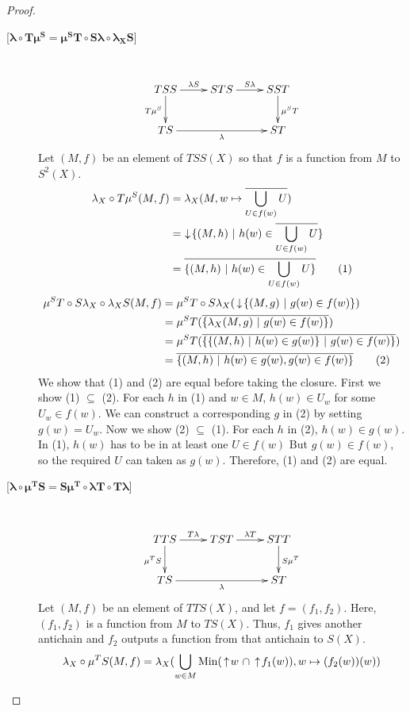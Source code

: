 \begin{proof}
\begin{description}
\item[{[}$\boldsymbol{\lambda\circ T\mu^S = \mu^S T\circ S\lambda\circ\lambda_X S}${]}] \hfill \\
\[
\xymatrix{
TSS\ar[r]^{\lambda S}\ar[d]_{T\mu^S} & STS\ar[r]^{S\lambda} & SST\ar[d]^{\mu^S T} \\
TS\ar[rr]_\lambda & & ST
}
\]
Let $(M,f)$ be an element of $TSS(X)$ so that $f$ is a function from $M$ to $S^2(X)$.
\begin{align*}
\lambda_X\circ T\mu^S (M,f) &= \lambda_X(M, w\mapsto \overline{\bigcup_{U\in f(w)} U}) \\
&= \,\,\downarrow\! \{(M,h)\ |\ h(w) \in \overline{\bigcup_{U\in f(w)}U}\} \\
&= \overline{ \{(M,h)\ |\ h(w) \in \bigcup_{U\in f(w)} U\}} \tag{1}
\end{align*}
\begin{align*}
\mu^S T\circ S\lambda_X\circ\lambda_X S (M,f) &= \mu^S T\circ S\lambda_X (\,\downarrow\! \{(M,g)\ |\ g(w)\in f(w)\}) \\
&= \mu^S T (\overline{ \{\lambda_X(M,g)\ |\ g(w)\in f(w) \}}) \\
&= \mu^S T (\overline{ \{ \{(M,h)\ |\ h(w)\in g(w)\}\ |\ g(w) \in f(w)\}} ) \\
&= \overline{ \{(M,h)\ |\ h(w)\in g(w), g(w) \in f(w)\} } \tag{2}
\end{align*}
We show that (1) and (2) are equal before taking the closure.  First we show (1) $\subseteq$ (2).  For each $h$ in (1) and $w\in M$, $h(w)\in U_w$ for some $U_w\in f(w)$.  We can construct a corresponding $g$ in (2) by setting $g(w)=U_w$.  Now we show (2) $\subseteq$ (1).  For each $h$ in (2), $h(w) \in g(w)$.  In (1), $h(w)$ has to be in at least one $U\in f(w)$  But $g(w)\in f(w)$, so the required $U$ can taken as $g(w)$.  Therefore, (1) and (2) are equal.
\item[{[}$\boldsymbol{\lambda\circ\mu^T S = S\mu^T\circ \lambda T\circ T\lambda}${]}] \hfill \\
\[
\xymatrix{
TTS\ar[r]^{T\lambda}\ar[d]_{\mu^T S} & TST\ar[r]^{\lambda T} & STT\ar[d]^{S\mu^T} \\
TS\ar[rr]_\lambda & & ST
}
\]
Let $(M,f)$ be an element of $TTS(X)$, and let $f=(f_1,f_2)$.  Here, $(f_1,f_2)$ is a function from $M$ to $TS(X)$.  Thus, $f_1$ gives another antichain and $f_2$ outputs a function from that antichain to $S(X)$.
\begin{align*}
\lambda_X\circ\mu^T S (M, f) &= \lambda_X (\bigcup_{w\in M} \Min (\ua w\ \cap \ua f_1(w)), w\mapsto (f_2(w))(w)) \\

\end{align*}
\end{description}
\end{proof}
